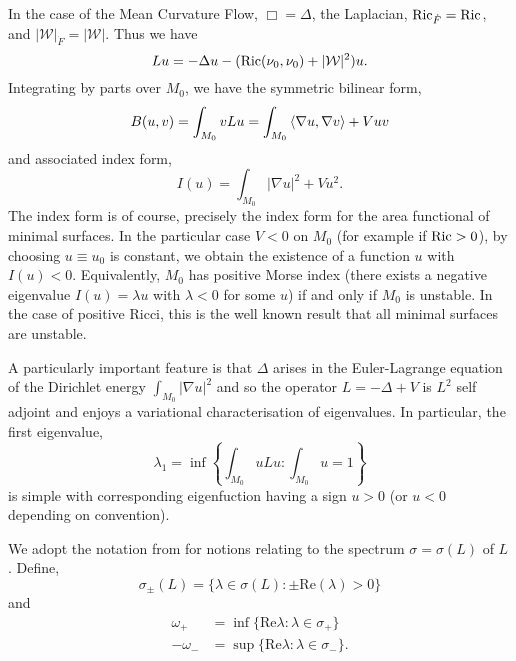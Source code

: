 \documentclass{amsart}
\begin{document}
\begin{rem}
\label{rem:mcflinearisation}
In the case of the Mean Curvature Flow, \(\Box = \Delta\), the Laplacian, \(\operatorname{Ric}_{\dot{F}} = \operatorname{Ric}\), and \(|\mathcal{W}|_{\dot{F}} = |\mathcal{W}|\). Thus we have
\[
L u = -\Delta u - (\operatorname{Ric}(\nu_0, \nu_0) + |\mathcal{W}|^2) u.
\]
Integrating by parts over \(M_0\), we have the symmetric bilinear form,
\[
B(u, v) = \int_{M_0} v Lu = \int_{M_0} \left\langle \nabla u,\nabla v \right\rangle + V uv 
\]
and associated index form,
\[
I(u) = \int_{M_0} |\nabla u|^2 + V u^2.
\]
The index form is of course, precisely the index form for the area functional of minimal surfaces. In the particular case \(V < 0\) on \(M_0\) (for example if \(\operatorname{Ric} > 0\)), by choosing \(u \equiv u_0\) is constant, we obtain the existence of a function \(u\) with \(I(u) < 0\). Equivalently, \(M_0\) has positive Morse index (there exists a negative eigenvalue \(I(u) = \lambda u\) with \(\lambda < 0\) for some $u$) if and only if \(M_0\) is unstable. In the case of positive Ricci, this is the well known result that all minimal surfaces are unstable.

A particularly important feature is that $\Delta$ arises in the Euler-Lagrange equation of the Dirichlet energy $\int_{M_0} |\nabla u|^2$ and so the operator $L = -\Delta + V$ is $L^2$ self adjoint and enjoys a variational characterisation of eigenvalues. In particular, the first eigenvalue,
\[
\lambda_1 = \inf \left\{\int_{M_0} u L u : \int_{M_0} u = 1\right\}
\]
is simple with corresponding eigenfuction having a sign \(u > 0\) (or \(u < 0\) depending on convention).
\end{rem}

We adopt the notation from \cite[Chapters 8, 9]{lunardi2012analytic} for notions relating to the spectrum \(\sigma = \sigma(L)\) of \(L\). Define,
\[
\sigma_{\pm} (L) = \{\lambda \in \sigma(L) : \pm \text{Re}(\lambda) > 0\}
\]
and
\begin{align*}
\omega_+ &= \inf \{\text{Re} \lambda : \lambda \in \sigma_+\} \\
- \omega_- &= \sup \{\text{Re} \lambda : \lambda \in \sigma_-\}.
\end{align*}

\printbibliography
\end{document}
